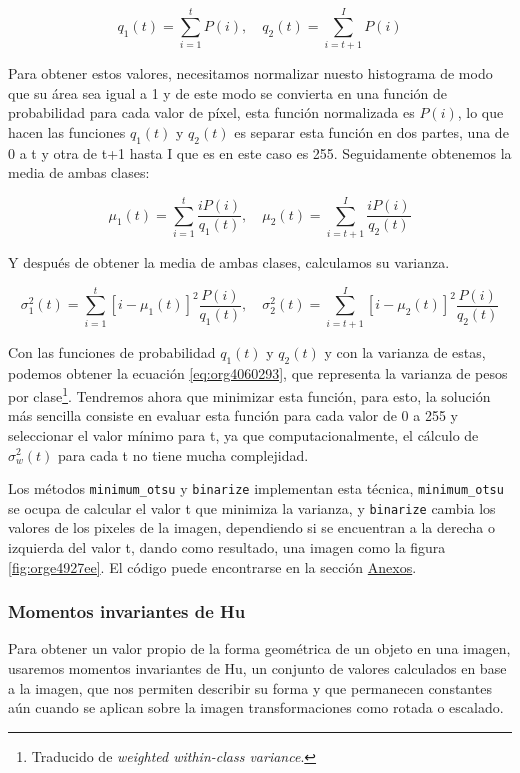 \documentclass[letter]{article}
\begin{document}
$$ q_1(t) = \sum_{i=1}^t P(i), \quad q_2(t) = \sum_{i=t+1}^I P(i) $$

Para obtener estos valores, necesitamos normalizar nuesto histograma de modo que
su área sea igual a 1 y de este modo se convierta en una función de probabilidad
para cada valor de píxel, esta función normalizada es \(P(i)\), lo que hacen las
funciones \(q_1(t)\) y \(q_2(t)\) es separar esta función en dos partes, una de 0 a
t y otra de t+1 hasta I que es en este caso es 255. Seguidamente obtenemos la
media de ambas clases:

$$ \mu_1(t) = \sum_{i=1}^t \frac{i P(i)}{q_1(t)} , \quad \mu_2(t) = \sum_{i=t+1}^I \frac{i P(i)}{q_2(t)} $$

Y después de obtener la media de ambas clases, calculamos su varianza.

$$ \sigma_1^2(t) = \sum_{i=1}^t [i-\mu_1(t)]^2 \frac{P(i)}{q_1(t)} , \quad \sigma_2^2(t) = \sum_{i=t+1}^I [i-\mu_2(t)]^2 \frac{P(i)}{q_2(t)} $$

Con las funciones de probabilidad \(q_1(t)\) y \(q_2(t)\) y con la varianza de
estas, podemos obtener la ecuación \ref{eq:org4060293}, que representa la varianza de
pesos por clase\footnote{Traducido de \emph{weighted within-class variance}.}. Tendremos ahora que minimizar esta función,
para esto, la solución más sencilla consiste en evaluar esta función para cada
valor de 0 a 255 y seleccionar el valor mínimo para t, ya que
computacionalmente, el cálculo de \(\sigma_w^2(t)\) para cada t no tiene mucha
complejidad.

Los métodos \texttt{minimum\_otsu} y \texttt{binarize} implementan esta técnica, \texttt{minimum\_otsu}
se ocupa de calcular el valor t que minimiza la varianza, y \texttt{binarize} cambia
los valores de los pixeles de la imagen, dependiendo si se encuentran a la
derecha o izquierda del valor t, dando como resultado, una imagen como la figura
\ref{fig:orge4927ee}. El código puede encontrarse en la sección \hyperref[sec:orgad8d800]{Anexos}.

\subsubsection{Momentos invariantes de Hu}
\label{sec:org19c3279}
Para obtener un valor propio de la forma geométrica de un objeto en una imagen,
usaremos momentos invariantes de Hu, un conjunto de valores calculados en base a
la imagen, que nos permiten describir su forma y que permanecen constantes aún
cuando se aplican sobre la imagen transformaciones como rotada o escalado.
\end{document}
